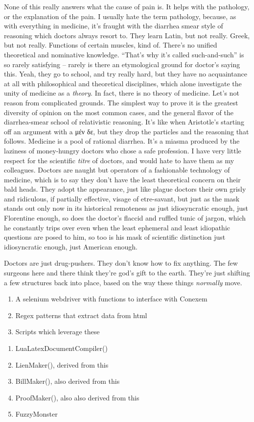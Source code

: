 \documentclass{article}
\begin{document}
None of this really answers what the cause of pain is. It helps with the pathology, or the explanation of the pain. I usually hate the term pathology, because, as with everything in medicine, it's fraught with the diarrhea smear style of reasoning which doctors always resort to. They learn Latin, but not really. Greek, but not really. Functions of certain muscles, kind of. There's no unified theoretical and nominative knowledge. ``That's why it's called such-and-such'' is so rarely satisfying -- rarely is there an etymological ground for doctor's saying this. Yeah, they go to school, and try really hard, but they have no acquaintance at all with philosophical and theoretical disciplines, which alone investigate the unity of medicine as a \textit{theory}. In fact, there is no theory of medicine. Let's not reason from complicated grounds. The simplest way to prove it is the greatest diversity of opinion on the most common cases, and the general flavor of the diarrhea-smear school of relativistic reasoning. It's like when Aristotle's starting off an argument with a μέν δε, but they drop the particles and the reasoning that follows. Medicine is a pool of rational diarrhea. It's a miasma produced by the laziness of money-hungry doctors who chose a safe profession. I have very little respect for the scientific \textit{titre} of doctors, and would hate to have them as my colleagues. Doctors are naught but operators of a fashionable technology of medicine, which is to say they don't have the least theoretical concern on their bald heads. They adopt the appearance, just like plague doctors their own grisly and ridiculous, if partially effective, visage of etre-savant, but just as the mask stands out only now in its historical remoteness as just idiosyncratic enough, just Florentine enough, so does the doctor's flaccid and ruffled tunic of jargon, which he constantly trips over even when the least ephemeral and least idiopathic questions are posed to him, so too is his mask of scientific distinction just idiosyncratic enough, just American enough.

Doctors are just drug-pushers. They don't know how to fix anything. The few surgeons here and there think they're god's gift to the earth. They're just shifting a few structures back into place, based on the way these things \textit{normally} move.

\begin{enumerate}
	\item A selenium webdriver with functions to interface with Conexem
	\item Regex patterns that extract data from html
	\item Scripts which leverage these
\end{enumerate}


\begin{enumerate}
	\item LuaLatexDocumentCompiler()
	\item LienMaker(), derived from this
	\item BillMaker(), also derived from this
	\item ProofMaker(), also also derived from this
	\item FuzzyMonster
\end{enumerate}
\end{document}
